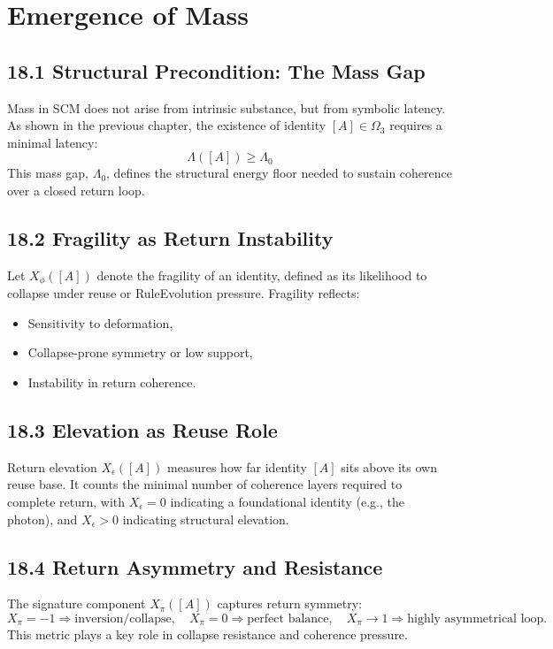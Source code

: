 \chapter{Emergence of Mass} \label{chapter:mass}

\section{18.1 \textbar{} Structural Precondition: The Mass Gap}
Mass in SCM does not arise from intrinsic substance, but from symbolic latency. As shown in the previous chapter, the existence of identity $[A] \in \Omega_3$ requires a minimal latency:
\[
\Lambda([A]) \geq \Lambda_0
\]
This mass gap, $\Lambda_0$, defines the structural energy floor needed to sustain coherence over a closed return loop.

\section{18.2 \textbar{} Fragility as Return Instability}
Let $X_\phi([A])$ denote the fragility of an identity, defined as its likelihood to collapse under reuse or RuleEvolution pressure. Fragility reflects:
\begin{itemize}
    \item Sensitivity to deformation,
    \item Collapse-prone symmetry or low support,
    \item Instability in return coherence.
\end{itemize}

\section{18.3 \textbar{} Elevation as Reuse Role}
Return elevation $X_\epsilon([A])$ measures how far identity $[A]$ sits above its own reuse base. It counts the minimal number of coherence layers required to complete return, with $X_\epsilon = 0$ indicating a foundational identity (e.g., the photon), and $X_\epsilon > 0$ indicating structural elevation.

\section{18.4 \textbar{} Return Asymmetry and Resistance}
The signature component $X_\pi([A])$ captures return symmetry:
\[
X_\pi = -1 \Rightarrow \text{inversion/collapse}, \quad
X_\pi = 0 \Rightarrow \text{perfect balance}, \quad
X_\pi \to 1 \Rightarrow \text{highly asymmetrical loop}.
\]
This metric plays a key role in collapse resistance and coherence pressure.


